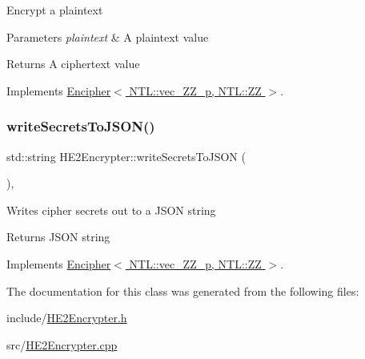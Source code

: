 Encrypt a plaintext 
\begin{DoxyParams}{Parameters}
{\em plaintext} & A plaintext value \\
\hline
\end{DoxyParams}
\begin{DoxyReturn}{Returns}
A ciphertext value 
\end{DoxyReturn}


Implements \hyperlink{classEncipher_aaf8138eb280608bfd03c6eb762ffc010}{Encipher$<$ N\+T\+L\+::vec\+\_\+\+Z\+Z\+\_\+p, N\+T\+L\+::\+Z\+Z $>$}.

\mbox{\label{classHE2Encrypter_a8cdf863bfbe046b4e57322adf5addddb}} 
\subsubsection{\texorpdfstring{write\+Secrets\+To\+J\+S\+O\+N()}{writeSecretsToJSON()}}
{\footnotesize\ttfamily std\+::string H\+E2\+Encrypter\+::write\+Secrets\+To\+J\+S\+ON (\begin{DoxyParamCaption}{ }\end{DoxyParamCaption})\hspace{0.3cm}{\ttfamily [override]}, {\ttfamily [virtual]}}

Writes cipher secrets out to a J\+S\+ON string \begin{DoxyReturn}{Returns}
J\+S\+ON string 
\end{DoxyReturn}


Implements \hyperlink{classEncipher_a27d3efa1e364c1f0d7def65454c61b85}{Encipher$<$ N\+T\+L\+::vec\+\_\+\+Z\+Z\+\_\+p, N\+T\+L\+::\+Z\+Z $>$}.



The documentation for this class was generated from the following files\+:\begin{DoxyCompactItemize}
\item 
include/\hyperlink{HE2Encrypter_8h}{H\+E2\+Encrypter.\+h}\item 
src/\hyperlink{HE2Encrypter_8cpp}{H\+E2\+Encrypter.\+cpp}\end{DoxyCompactItemize}
